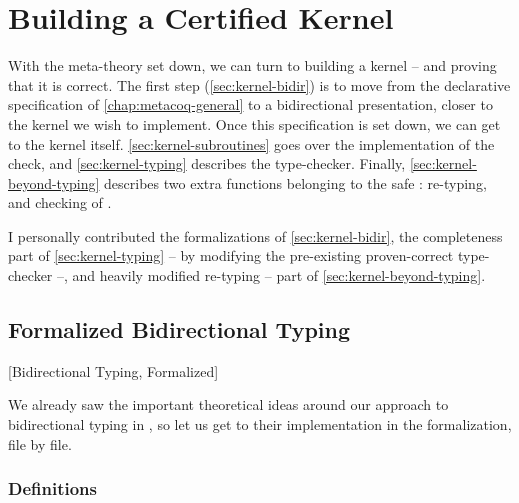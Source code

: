 \chapter{Building a Certified Kernel}
\label{chap:kernel-correctness}

\margintoc

With the meta-theory set down, we can turn to building a kernel – and proving that it is
correct. The first step (\cref{sec:kernel-bidir})
is to move from the declarative specification of
\cref{chap:metacoq-general} to a bidirectional presentation,
closer to the kernel we wish to implement.
Once this specification is set down, we can get to the kernel itself.
\cref{sec:kernel-subroutines} goes over the implementation of the
 check, and \cref{sec:kernel-typing} describes the type-checker.
Finally, \cref{sec:kernel-beyond-typing} describes two extra functions belonging to the safe
: re-typing, and checking of .

I personally contributed the formalizations of \cref{sec:kernel-bidir},
the completeness part of \cref{sec:kernel-typing} –
by modifying the pre-existing proven-correct type-checker –,
and heavily modified re-typing – part of \cref{sec:kernel-beyond-typing}.

\section{Formalized Bidirectional Typing}
  [Bidirectional Typing, Formalized]
\label{sec:kernel-bidir}

We already saw the important theoretical ideas around our approach to bidirectional typing in
, so let us get to their implementation in the formalization, file by file.

\subsection{Definitions}

